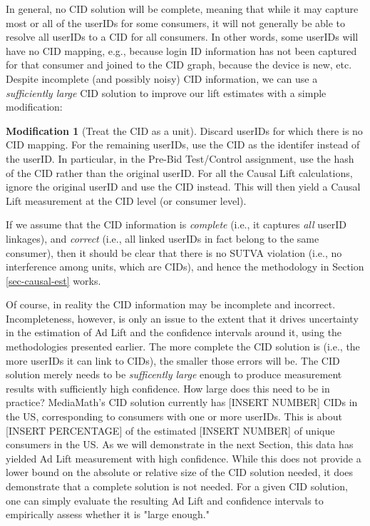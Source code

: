 \documentclass[11pt,a4paper]{article}
\theoremstyle{definition}
\theoremstyle{remark}
\theoremstyle{definition}
\theoremstyle{definition}
\theoremstyle{definition}
\theoremstyle{definition}
\theoremstyle{definition}
\newtheorem{modification}{Modification}[section]
\theoremstyle{definition}
\begin{document}
In general, no CID solution will be complete, meaning that while it may capture most or all of the userIDs for some consumers, it will not generally be able to resolve all userIDs to a CID for all consumers. In other words, some userIDs will have no CID mapping, e.g., because login ID information has not been captured for that consumer and joined to the CID graph, because the device is new, etc. Despite incomplete (and possibly noisy) CID information, we can use a {\em sufficiently large} CID solution to improve our lift estimates with a simple modification: 

\begin{modification}[Treat the CID as a unit]
Discard userIDs for which there is no CID mapping. For the remaining userIDs, use the CID as the identifer instead of the userID. In particular, in the Pre-Bid Test/Control assignment, use the hash of the CID rather than the original userID. For all the Causal Lift calculations, ignore the original userID and use the CID instead. This will then yield a Causal Lift measurement at the CID level (or consumer level).
\end{modification}

If we assume that the CID information is \textit{complete} (i.e., it captures \textit{all} userID linkages), and \textit{correct} (i.e., all linked userIDs in fact belong to the same consumer), then it should be clear that there is no SUTVA violation (i.e., no interference among units, which are CIDs), and hence the methodology in Section \ref{sec-causal-est} works. 

Of course, in reality the CID information may be incomplete and incorrect. Incompleteness, however, is only an issue to the extent that it drives uncertainty in the estimation of Ad Lift and the confidence intervals around it, using the methodologies presented earlier. The more complete the CID solution is (i.e., the more userIDs it can link to CIDs), the smaller those errors will be. The CID solution merely needs to be {\em sufficently large} enough to produce measurement results with sufficiently high confidence. How large does this need to be in practice? MediaMath's CID solution currently has [INSERT NUMBER] CIDs in the US, corresponding to consumers with one or more userIDs. This is about [INSERT PERCENTAGE] of the estimated [INSERT NUMBER] of unique consumers in the US. As we will demonstrate in the next Section, this data has yielded Ad Lift measurement with high confidence. While this does not provide a lower bound on the absolute or relative size of the CID solution needed, it does demonstrate that a complete solution is not needed. For a given CID solution, one can simply evaluate the resulting Ad Lift and confidence intervals to empirically assess whether it is "large enough."
\end{document}
